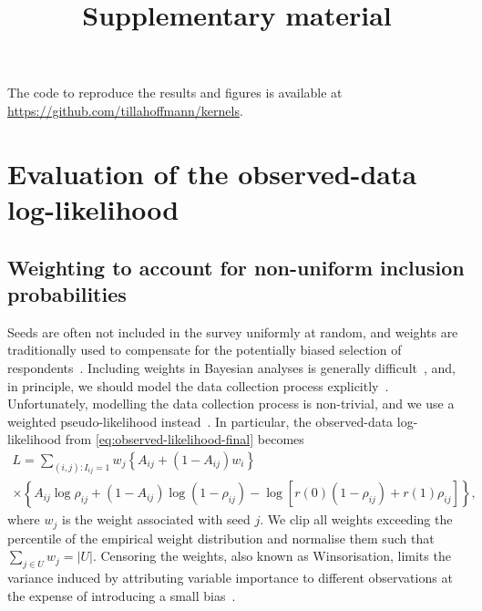 \documentclass{scrartcl}
\title{Supplementary material}
\author{}
\date{}
\newcommand{\card}[1]{\left|#1\right|}
\newcommand{\seeds}{U}
\begin{document}
    \maketitle
\fi

\appendix
{}

\begin{refsection}

The code to reproduce the results and figures is available at \url{https://github.com/tillahoffmann/kernels}.

\section{Evaluation of the observed-data log-likelihood}

\subsection{Weighting to account for non-uniform inclusion probabilities}

Seeds are often not included in the survey uniformly at random, and weights are traditionally used to compensate for the potentially biased selection of respondents~\cite{Kish1992}. Including weights in Bayesian analyses is generally difficult~\cite{Gelman2007}, and, in principle, we should model the data collection process explicitly~\cite[chapter~8]{Gelman2013}. Unfortunately, modelling the data collection process is non-trivial, and we use a weighted pseudo-likelihood instead~\cite{Pfeffermann1996}. In particular, the observed-data log-likelihood from \cref{eq:observed-likelihood-final} becomes
\begin{multline}
    L = \sum_{(i,j):I_{ij} = 1} w_j\left\{A_{ij} + (1 - A_{ij})w_i\right\}
    \\\times\left\{A_{ij}\log\rho_{ij} + (1-A_{ij})\log(1-\rho_{ij})-\log\left[r(0)(1 - \rho_{ij}) + r(1)\rho_{ij}\right]\right\},\label{eq:survey-weighted-log-likelihood}
\end{multline}
where $w_j$ is the weight associated with seed $j$. We clip all weights exceeding the  percentile of the empirical weight distribution and normalise them such that $\sum_{j\in\seeds}w_j=\card{\seeds}$. Censoring the weights, also known as Winsorisation, limits the variance induced by attributing variable importance to different observations at the expense of introducing a small bias~\cite{Kish1992}.


\end{refsection}
\end{document}
